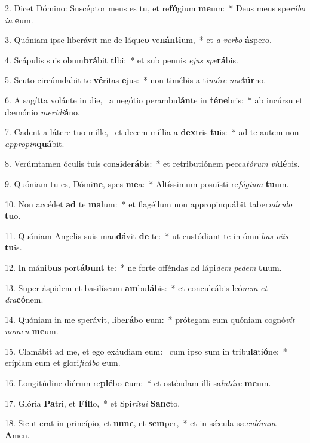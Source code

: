 2. Dicet Dómino: Suscéptor meus es tu, et re\textbf{fú}gium \textbf{me}um:~*  Deus meus spe\textit{rá}\textit{bo} \textit{in} \textbf{e}um.\

3. Quóniam ipse liberávit me de láque\textbf{o} ve\textbf{nán}\textbf{ti}um,~*  et \textit{a} \textit{ver}\textit{bo} \textbf{ás}pero.\

4. Scápulis suis obum\textbf{brá}bit \textbf{ti}bi:~*  et sub pennis \textit{e}\textit{jus} \textit{spe}\textbf{rá}bis.\

5. Scuto circúmdabit te \textbf{vé}ritas \textbf{e}jus:~*  non timébis a ti\textit{mó}\textit{re} \textit{noc}\textbf{túr}no.\

6. A sagítta volánte in die, \dag\  a negótio perambu\textbf{lán}te in \textbf{té}\textbf{ne}bris:~*  ab incúrsu et dæmónio \textit{me}\textit{ri}\textit{di}\textbf{á}no.\

7. Cadent a látere tuo mille, \dag\  et decem míllia a \textbf{dex}tris \textbf{tu}is:~*  ad te autem non \textit{ap}\textit{pro}\textit{pin}\textbf{quá}bit.\

8. Verúmtamen óculis tuis con\textbf{si}de\textbf{rá}bis:~*  et retributiónem pecca\textit{tó}\textit{rum} \textit{vi}\textbf{dé}bis.\

9. Quóniam tu es, Dómi\textbf{ne}, spes \textbf{me}a:~*  Altíssimum posuísti re\textit{fú}\textit{gi}\textit{um} \textbf{tu}um.\

10. Non accédet \textbf{ad} te \textbf{ma}lum:~*  et flagéllum non appropinquábit taber\textit{ná}\textit{cu}\textit{lo} \textbf{tu}o.\

11. Quóniam Angelis suis man\textbf{dá}vit \textbf{de} te:~*  ut custódiant te in ómni\textit{bus} \textit{vi}\textit{is} \textbf{tu}is.\

12. In máni\textbf{bus} por\textbf{tá}\textbf{bunt} te:~*  ne forte offéndas ad lápi\textit{dem} \textit{pe}\textit{dem} \textbf{tu}um.\

13. Super áspidem et basilíscum \textbf{am}bu\textbf{lá}bis:~*  et conculcábis leó\textit{nem} \textit{et} \textit{dra}\textbf{có}nem.\

14. Quóniam in me sperávit, libe\textbf{rá}bo \textbf{e}um:~*  prótegam eum quóniam cognó\textit{vit} \textit{no}\textit{men} \textbf{me}um.\

15. Clamábit ad me, et ego exáudiam eum: \dag\  cum ipso sum in tribu\textbf{la}ti\textbf{ó}ne:~*  erípiam eum et glori\textit{fi}\textit{cá}\textit{bo} \textbf{e}um.\

16. Longitúdine diérum re\textbf{plé}bo \textbf{e}um:~*  et osténdam illi sa\textit{lu}\textit{tá}\textit{re} \textbf{me}um.\

17. Glória \textbf{Pa}tri, et \textbf{Fí}\textbf{li}o,~*  et Spi\textit{rí}\textit{tu}\textit{i} \textbf{Sanc}to.\

18. Sicut erat in princípio, et \textbf{nunc}, et \textbf{sem}per,~*  et in sǽcula sæ\textit{cu}\textit{ló}\textit{rum}. \textbf{A}men.\

